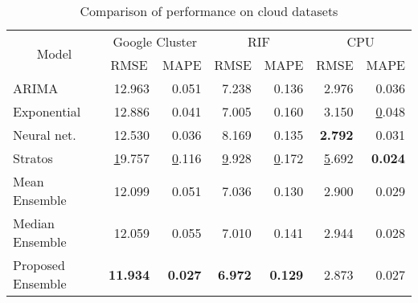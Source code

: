 \begin{table}[]
\centering
\caption{Comparison of performance on cloud datasets}
\label{my-label}
\begin{tabular}{|l|r|r|r|r|r|r|}
\hline
\multicolumn{1}{|c|}{\multirow{2}{*}{Model}} & \multicolumn{2}{c|}{Google Cluster}                   & \multicolumn{2}{c|}{RIF}                              & \multicolumn{2}{c|}{CPU}                              \\ \cline{2-7} 
\multicolumn{1}{|c|}{}                       & \multicolumn{1}{c|}{RMSE} & \multicolumn{1}{c|}{MAPE} & \multicolumn{1}{c|}{RMSE} & \multicolumn{1}{c|}{MAPE} & \multicolumn{1}{c|}{RMSE} & \multicolumn{1}{c|}{MAPE} \\ \hline
ARIMA                                        & 12.963                    & 0.051                     & 7.238                     & 0.136                     & 2.976                     & 0.036                     \\ \hline
Exponential                                  & 12.886                    & 0.041                     & 7.005                     & 0.160                     & 3.150                     & {\ul 0.048}               \\ \hline
Neural net.                                  & 12.530                    & 0.036                     & 8.169                     & 0.135                     & \textbf{2.792}            & 0.031                     \\ \hline
Stratos                                      & {\ul 19.757}              & {\ul 0.116}               & {\ul 9.928}               & {\ul 0.172}               & {\ul 5.692}               & \textbf{0.024}            \\ \hline
Mean Ensemble                                      & 12.099              & 0.051               & 7.036               & 0.130               & 2.900               & 0.029            \\ \hline
Median Ensemble                                      &  12.059              & 0.055               &  7.010               & 0.141               & 2.944               & 0.028            \\ \hline

Proposed Ensemble                                     & \textbf{11.934}           & \textbf{0.027}            & \textbf{6.972}            & \textbf{0.129}            & 2.873                     & 0.027                     \\ \hline
\end{tabular}
\end{table}

